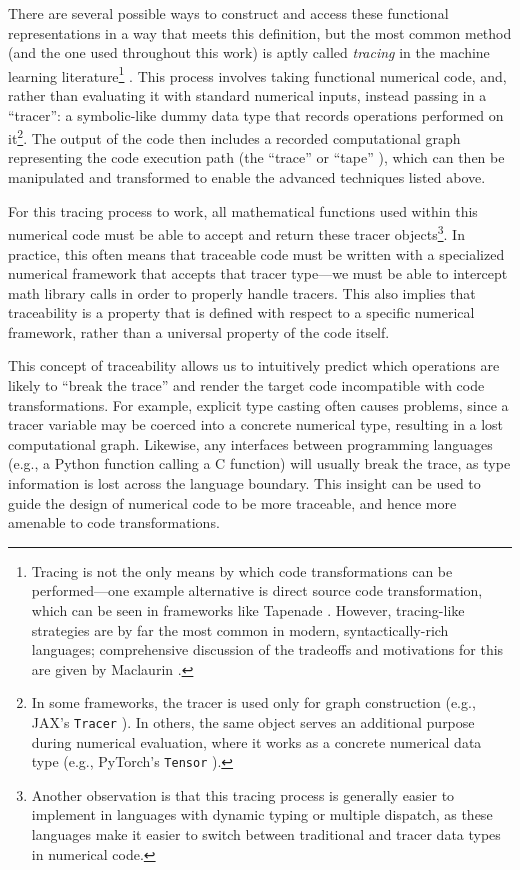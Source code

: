 There are several possible ways to construct and access these functional representations in a way that meets this definition, but the most common method (and the one used throughout this work) is aptly called \emph{tracing} in the machine learning literature\footnote{Tracing is not the only means by which code transformations can be performed—one example alternative is direct source code transformation, which can be seen in frameworks like Tapenade \cite{tapenade}. However, tracing-like strategies are by far the most common in modern, syntactically-rich languages; comprehensive discussion of the tradeoffs and motivations for this are given by Maclaurin \cite{maclaurin_modeling_2016}.} \cite{jax, frostig_compiling_2018, baydin_automatic_2018}. This process involves taking functional numerical code, and, rather than evaluating it with standard numerical inputs, instead passing in a ``tracer'': a symbolic-like dummy data type that records operations performed on it\footnote{In some frameworks, the tracer is used only for graph construction (e.g., JAX's \texttt{Tracer} \cite{jax}). In others, the same object serves an additional purpose during numerical evaluation, where it works as a concrete numerical data type (e.g., PyTorch's \texttt{Tensor} \cite{paszke_pytorch_2019}).}. The output of the code then includes a recorded computational graph representing the code execution path (the ``trace'' or ``tape'' \cite{paszke_pytorch_2019}), which can then be manipulated and transformed to enable the advanced techniques listed above.

For this tracing process to work, all mathematical functions used within this numerical code must be able to accept and return these tracer objects\footnote{Another observation is that this tracing process is generally easier to implement in languages with dynamic typing or multiple dispatch, as these languages make it easier to switch between traditional and tracer data types in numerical code.}. In practice, this often means that traceable code must be written with a specialized numerical framework that accepts that tracer type—we must be able to intercept math library calls in order to properly handle tracers. This also implies that traceability is a property that is defined with respect to a specific numerical framework, rather than a universal property of the code itself.

This concept of traceability allows us to intuitively predict which operations are likely to ``break the trace'' and render the target code incompatible with code transformations. For example, explicit type casting often causes problems, since a tracer variable may be coerced into a concrete numerical type, resulting in a lost computational graph. Likewise, any interfaces between programming languages (e.g., a Python function calling a C function) will usually break the trace, as type information is lost across the language boundary. This insight can be used to guide the design of numerical code to be more traceable, and hence more amenable to code transformations.

